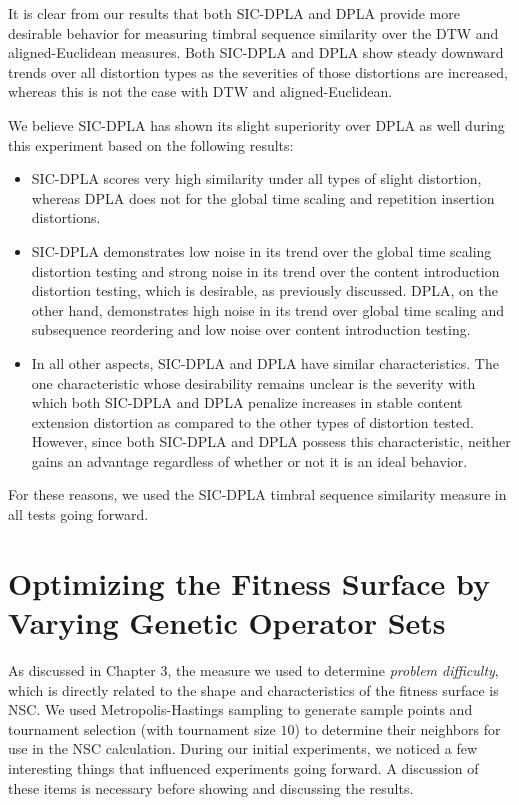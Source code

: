 \documentclass[a4paper,12pt]{report} 	%
\numberwithin{figure}{chapter}
\numberwithin{table}{chapter}
\numberwithin{equation}{chapter}
\begin{document}
\begin{flushleft}
It is clear from our results that both SIC-DPLA and DPLA provide more desirable behavior for measuring timbral sequence similarity over the DTW and aligned-Euclidean measures. Both SIC-DPLA and DPLA show steady downward trends over all distortion types as the severities of those distortions are increased, whereas this is not the case with DTW and aligned-Euclidean.

We believe SIC-DPLA has shown its slight superiority over DPLA as well during this experiment based on the following results:
\begin{itemize}
\item SIC-DPLA scores very high similarity under all types of slight distortion, whereas DPLA does not for the global time scaling and repetition insertion distortions. 
\item SIC-DPLA demonstrates low noise in its trend over the global time scaling distortion testing and strong noise in its trend over the content introduction distortion testing, which is desirable, as previously discussed. DPLA, on the other hand, demonstrates high noise in its trend over global time scaling and subsequence reordering and low noise over content introduction testing.
\item In all other aspects, SIC-DPLA and DPLA have similar characteristics. The one characteristic whose desirability remains unclear is the severity with which both SIC-DPLA and DPLA penalize increases in stable content extension distortion as compared to the other types of distortion tested. However, since both SIC-DPLA and DPLA possess this characteristic, neither gains an advantage regardless of whether or not it is an ideal behavior.
\end{itemize}

For these reasons, we used the SIC-DPLA timbral sequence similarity measure in all tests going forward.

\section{Optimizing the Fitness Surface by Varying Genetic Operator Sets}
As discussed in Chapter 3, the measure we used to determine \emph{problem difficulty}, which is directly related to the shape and characteristics of the fitness surface is NSC. We used Metropolis-Hastings sampling to generate sample points and tournament selection (with tournament size $10$) to determine their neighbors for use in the NSC calculation. During our initial experiments, we noticed a few interesting things that influenced experiments going forward. A discussion of these items is necessary before showing and discussing the results.

\end{flushleft}
\end{document}
